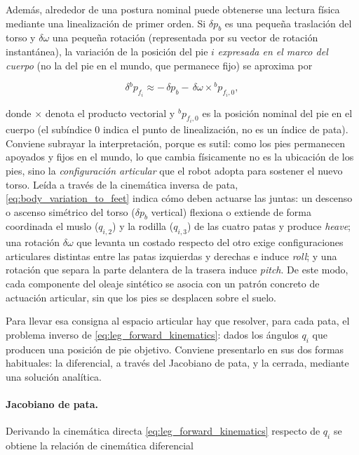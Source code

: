 \documentclass[12pt,a4paper]{report}
\begin{document}
Además, alrededor de una postura nominal puede obtenerse una lectura física
mediante una linealización de primer orden. Si \(\delta p_b\) es una pequeña
traslación del torso y \(\delta \omega\) una pequeña rotación (representada por su
vector de rotación instantánea), la variación de la posición del pie \(i\)
\emph{expresada en el marco del cuerpo} (no la del pie en el mundo, que permanece
fijo) se aproxima por

\begin{equation}
\delta {}^{b}\!p_{f_i}
\approx
-\,\delta p_b
-\,\delta \omega \times {}^{b}\!p_{f_i,0},
\label{eq:body_variation_to_feet}
\end{equation}

donde \(\times\) denota el producto vectorial y \({}^{b}\!p_{f_i,0}\) es la
posición nominal del pie en el cuerpo (el subíndice \(0\) indica el punto de
linealización, no es un índice de pata). Conviene subrayar la interpretación,
porque es sutil: como los pies permanecen apoyados y fijos en el mundo, lo que
cambia físicamente no es la ubicación de los pies, sino la \emph{configuración
articular} que el robot adopta para sostener el nuevo torso. Leída a través de la
cinemática inversa de pata, \eqref{eq:body_variation_to_feet} indica cómo deben
actuarse las juntas: un descenso o ascenso simétrico del torso (\(\delta p_b\)
vertical) flexiona o extiende de forma coordinada el muslo (\(q_{i,2}\)) y la
rodilla (\(q_{i,3}\)) de las cuatro patas y produce \emph{heave}; una rotación
\(\delta\omega\) que levanta un costado respecto del otro exige configuraciones
articulares distintas entre las patas izquierdas y derechas e induce \emph{roll};
y una rotación que separa la parte delantera de la trasera induce \emph{pitch}. De
este modo, cada componente del oleaje sintético se asocia con un patrón concreto
de actuación articular, sin que los pies se desplacen sobre el suelo.

Para llevar esa consigna al espacio articular hay que resolver, para cada pata,
el problema inverso de \eqref{eq:leg_forward_kinematics}: dados los ángulos
\(q_i\) que producen una posición de pie objetivo. Conviene presentarlo en sus
dos formas habituales: la diferencial, a través del Jacobiano de pata, y la
cerrada, mediante una solución analítica.

\paragraph{Jacobiano de pata.}
Derivando la cinemática directa \eqref{eq:leg_forward_kinematics} respecto de
\(q_i\) se obtiene la relación de cinemática diferencial
\end{document}
